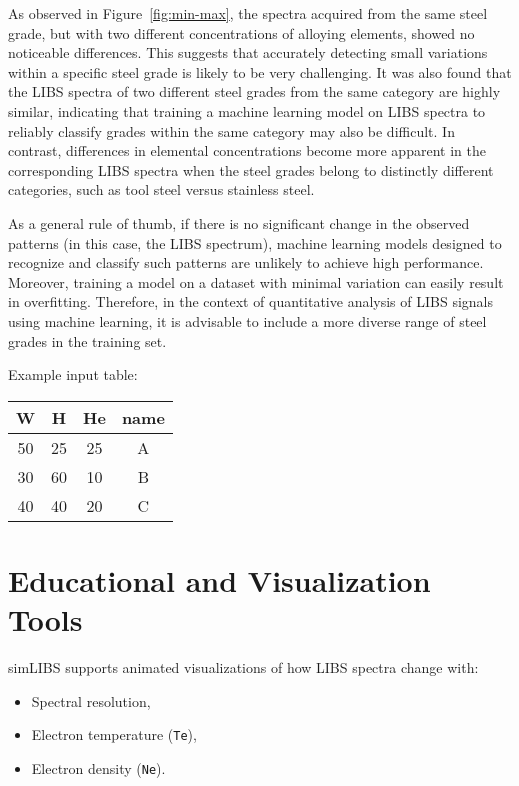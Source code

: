 \documentclass[12pt,a4paper]{article}
\begin{document}
	As observed in Figure~\ref{fig:min-max}, the spectra acquired from the same steel grade, but with two different concentrations of alloying elements, showed no noticeable differences. This suggests that accurately detecting small variations within a specific steel grade is likely to be very challenging. It was also found that the LIBS spectra of two different steel grades from the same category are highly similar, indicating that training a machine learning model on LIBS spectra to reliably classify grades within the same category may also be difficult. In contrast, differences in elemental concentrations become more apparent in the corresponding LIBS spectra when the steel grades belong to distinctly different categories, such as tool steel versus stainless steel.
	
	
	As a general rule of thumb, if there is no significant change in the observed patterns (in this case, the LIBS spectrum), machine learning models designed to recognize and classify such patterns are unlikely to achieve high performance. Moreover, training a model on a dataset with minimal variation can easily result in overfitting. Therefore, in the context of quantitative analysis of LIBS signals using machine learning, it is advisable to include a more diverse range of steel grades in the training set.
	
	
	
	
	
	Example input table:
	
	\begin{center}
		\begin{tabular}{cccc}
			\toprule
			W & H & He & name \\
			\midrule
			50 & 25 & 25 & A \\
			30 & 60 & 10 & B \\
			40 & 40 & 20 & C \\
			\bottomrule
		\end{tabular}
	\end{center}
	
	\section{Educational and Visualization Tools}
	simLIBS supports animated visualizations of how LIBS spectra change with:
	\begin{itemize}
		\item Spectral resolution,
		\item Electron temperature (\texttt{Te}),
		\item Electron density (\texttt{Ne}).
	\end{itemize}
	
\end{document}
